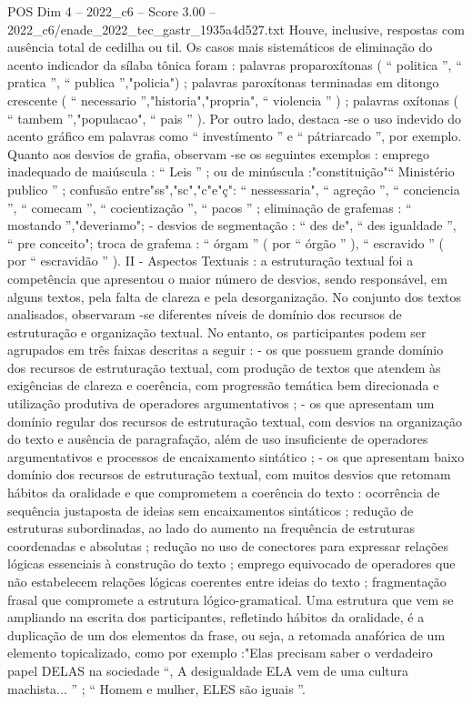 \begin{textsample}{POS Dim 4 – 2022\_c6 – Score 3.00 – 2022\_c6/enade\_2022\_tec\_gastr\_1935a4d527.txt}
Houve, inclusive, respostas com ausência total de cedilha ou til.
Os casos mais sistemáticos de eliminação do acento indicador da sílaba tônica foram : palavras proparoxítonas ( “ politica ”, “ pratica ”, “ publica ”,"policia") ; palavras paroxítonas terminadas em ditongo crescente ( “ necessario ”,"historia","propria", “ violencia ” ) ; palavras oxítonas ( “ tambem ”,"populacao", “ pais ” ).
Por outro lado, destaca -se o uso indevido do acento gráfico em palavras como “ investímento ” e “ pátriarcado ”, por exemplo.
Quanto aos desvios de grafia, observam -se os seguintes exemplos : emprego inadequado de maiúscula : “ Leis ” ; ou de minúscula :"constituição"“ Ministério publico ” ; confusão entre"ss","sc","c"e"ç": “ nessessaria", “ agreção ”, “ conciencia ”, “ comecam ”, “ cocientização ”, “ pacos ” ; eliminação de grafemas : “ mostando ”,"deveriamo"; - desvios de segmentação : “ des de", “ des igualdade ”, “ pre conceito"; troca de grafema : “ órgam ” ( por “ órgão ” ), “ escravido ” ( por “ escravidão ” ).
II - Aspectos Textuais : a estruturação textual foi a competência que apresentou o maior número de desvios, sendo responsável, em alguns textos, pela falta de clareza e pela desorganização.
No conjunto dos textos analisados, observaram -se diferentes níveis de domínio dos recursos de estruturação e organização textual.
No entanto, os participantes podem ser agrupados em três faixas descritas a seguir : - os que possuem grande domínio dos recursos de estruturação textual, com produção de textos que atendem às exigências de clareza e coerência, com progressão temática bem direcionada e utilização produtiva de operadores argumentativos ; - os que apresentam um domínio regular dos recursos de estruturação textual, com desvios na organização do texto e ausência de paragrafação, além de uso insuficiente de operadores argumentativos e processos de encaixamento sintático ; - os que apresentam baixo domínio dos recursos de estruturação textual, com muitos desvios que retomam hábitos da oralidade e que comprometem a coerência do texto : ocorrência de sequência justaposta de ideias sem encaixamentos sintáticos ; redução de estruturas subordinadas, ao lado do aumento na frequência de estruturas coordenadas e absolutas ; redução no uso de conectores para expressar relações lógicas essenciais à construção do texto ; emprego equivocado de operadores que não estabelecem relações lógicas coerentes entre ideias do texto ; fragmentação frasal que compromete a estrutura lógico-gramatical.
Uma estrutura que vem se ampliando na escrita dos participantes, refletindo hábitos da oralidade, é a duplicação de um dos elementos da frase, ou seja, a retomada anafórica de um elemento topicalizado, como por exemplo :"Elas precisam saber o verdadeiro papel DELAS na sociedade “, A desigualdade ELA vem de uma cultura machista... ” ; “ Homem e mulher, ELES são iguais ”.

\end{textsample}
